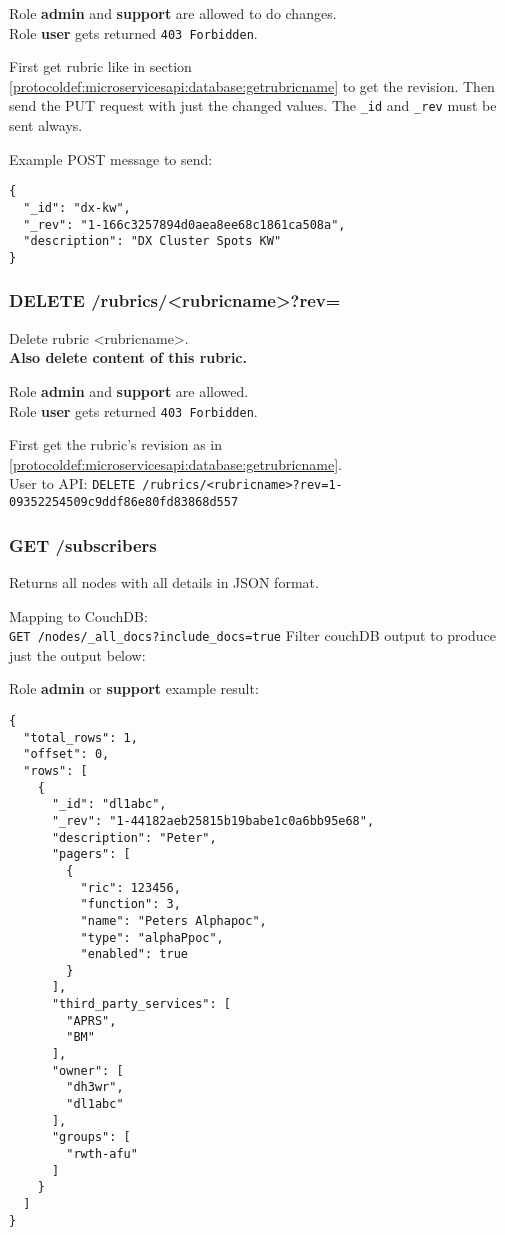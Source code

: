 Role \textbf{admin} and \textbf{support} are allowed to do changes.\\
Role \textbf{user} gets returned \verb|403 Forbidden|.

First get rubric like in section \ref{protocoldef:microservicesapi:database:getrubricname} to get the revision. Then send the PUT request with just the changed values. The \verb|_id| and \verb|_rev| must be sent always.

Example POST message to send:
\begin{lstlisting}
{
  "_id": "dx-kw",
  "_rev": "1-166c3257894d0aea8ee68c1861ca508a",
  "description": "DX Cluster Spots KW"
}
\end{lstlisting}


\subsubsection{DELETE /rubrics/<rubricname>?rev=}
Delete rubric <rubricname>.\\
\textbf{Also delete content of this rubric.}

Role \textbf{admin} and \textbf{support} are allowed.\\
Role \textbf{user} gets returned \verb|403 Forbidden|.

First get the rubric's revision as in \ref{protocoldef:microservicesapi:database:getrubricname}.\\
User to API: \verb|DELETE /rubrics/<rubricname>?rev=1-09352254509c9ddf86e80fd83868d557|


\subsubsection{GET /subscribers}
\label{protocoldef:microservicesapi:database:subscribers}
Returns all nodes with all details in JSON format.

Mapping to CouchDB:\\
\verb|GET /nodes/_all_docs?include_docs=true|
Filter couchDB output to produce just the output below:

Role \textbf{admin} or \textbf{support} example result:
\begin{lstlisting}
{
  "total_rows": 1,
  "offset": 0,
  "rows": [
    {
      "_id": "dl1abc",
      "_rev": "1-44182aeb25815b19babe1c0a6bb95e68",
      "description": "Peter",
      "pagers": [
        {
          "ric": 123456,
          "function": 3,
          "name": "Peters Alphapoc",
          "type": "alphaPpoc",
          "enabled": true
        }
      ],
      "third_party_services": [
        "APRS",
        "BM"
      ],
      "owner": [
        "dh3wr",
        "dl1abc"
      ],
      "groups": [
        "rwth-afu"
      ]
    }
  ]
}
\end{lstlisting}

